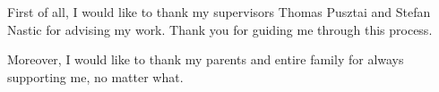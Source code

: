 \begin{acknowledgements*}

First of all, I would like to thank my supervisors Thomas Pusztai and Stefan Nastic for advising my work. Thank you for guiding me through this process.

Moreover, I would like to thank my parents and entire family for always supporting me, no matter what.

\end{acknowledgements*}
